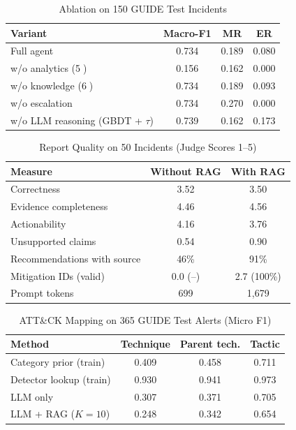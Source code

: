 \documentclass[conference]{IEEEtran}
\begin{document}
\begin{table}[t]
\caption{Ablation on 150 GUIDE Test Incidents}
\label{tab:abl}
\centering
\footnotesize
\setlength{\tabcolsep}{4pt}
\begin{tabular}{@{}lccc@{}}
\toprule
\textbf{Variant} & \textbf{Macro-F1} & \textbf{MR} & \textbf{ER} \\
\midrule
Full agent                          & 0.734 & 0.189 & 0.080 \\
w/o analytics (\textcircled{5})     & 0.156 & 0.162 & 0.000 \\
w/o knowledge (\textcircled{6})     & 0.734 & 0.189 & 0.093 \\
w/o escalation                      & 0.734 & 0.270 & 0.000 \\
w/o LLM reasoning (GBDT + $\tau$)   & 0.739 & 0.162 & 0.173 \\
\bottomrule
\end{tabular}
\end{table}

\begin{table}[t]
\caption{Report Quality on 50 Incidents (Judge Scores 1--5)}
\label{tab:e4}
\centering
\footnotesize
\setlength{\tabcolsep}{4pt}
\begin{tabular}{@{}lcc@{}}
\toprule
\textbf{Measure} & \textbf{Without RAG} & \textbf{With RAG} \\
\midrule
Correctness               & 3.52 & 3.50 \\
Evidence completeness     & 4.46 & 4.56 \\
Actionability             & 4.16 & 3.76 \\
Unsupported claims        & 0.54 & 0.90 \\
Recommendations with source & 46\% & 91\% \\
Mitigation IDs (valid)    & 0.0 (--) & 2.7 (100\%) \\
Prompt tokens             & 699 & 1{,}679 \\
\bottomrule
\end{tabular}
\end{table}

\begin{table}[t]
\caption{ATT\&CK Mapping on 365 GUIDE Test Alerts (Micro F1)}
\label{tab:e2}
\centering
\footnotesize
\setlength{\tabcolsep}{4pt}
\begin{tabular}{@{}lccc@{}}
\toprule
\textbf{Method} & \textbf{Technique} & \textbf{Parent tech.} & \textbf{Tactic} \\
\midrule
Category prior (train)  & 0.409 & 0.458 & 0.711 \\
Detector lookup (train) & 0.930 & 0.941 & 0.973 \\
LLM only                & 0.307 & 0.371 & 0.705 \\
LLM + RAG ($K{=}10$)    & 0.248 & 0.342 & 0.654 \\
\bottomrule
\end{tabular}
\end{table}
\end{document}
